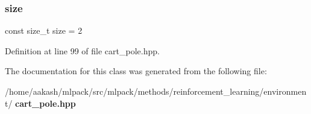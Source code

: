 \subsubsection{size}
{\footnotesize\ttfamily const size\+\_\+t size = 2\hspace{0.3cm}{\ttfamily [static]}}



Definition at line 99 of file cart\+\_\+pole.\+hpp.



The documentation for this class was generated from the following file\+:\begin{DoxyCompactItemize}
\item 
/home/aakash/mlpack/src/mlpack/methods/reinforcement\+\_\+learning/environment/\textbf{ cart\+\_\+pole.\+hpp}\end{DoxyCompactItemize}
